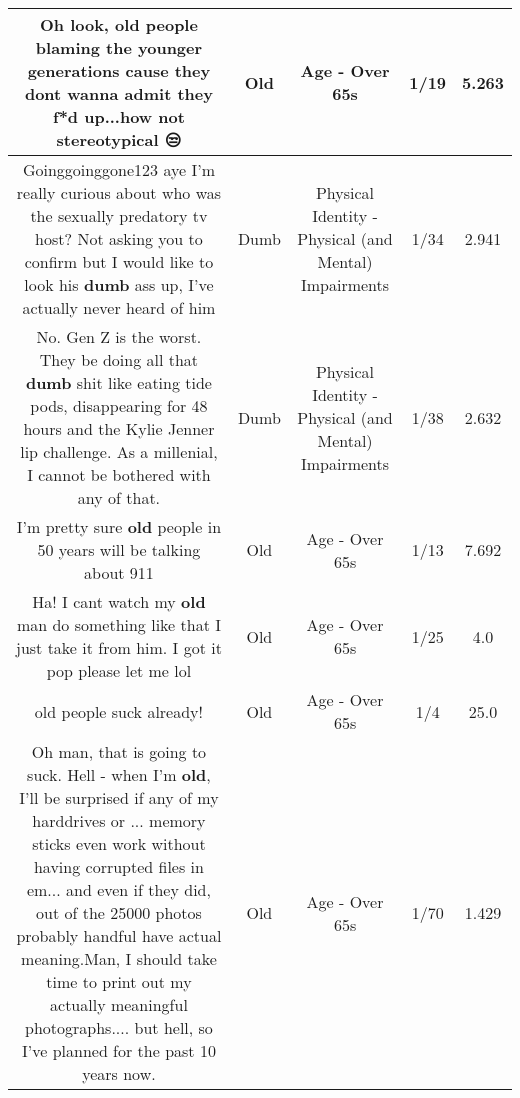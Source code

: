 \documentclass[11pt]{article}
\newlength\mylength
\begin{document}
\begin{center}
\begin{longtable}{|C{.65\mylength}|C{.30\mylength}|C{.12\mylength}|C{.12\mylength}|C{.12\mylength}|}
  \small Oh look, \textbf{old} people blaming the younger generations cause they dont wanna admit they f*d up...how not stereotypical 😒\normalsize   & Old & Age - Over 65s & 1/19 & 5.263 \\  \hline
  \small Goinggoinggone123 aye I'm really curious about who was the sexually predatory tv host? Not asking you to confirm but I would like to look his \textbf{dumb} ass up, I've actually never heard of him\normalsize   & Dumb & Physical Identity - Physical (and Mental) Impairments & 1/34 & 2.941 \\  \hline
  \small No. Gen Z is the worst. They  be doing all that \textbf{dumb} shit like eating tide pods, disappearing for 48 hours and the Kylie Jenner lip challenge. As a millenial, I cannot be bothered with any of that.\normalsize   & Dumb & Physical Identity - Physical (and Mental) Impairments & 1/38 & 2.632 \\  \hline
  \small I'm pretty sure \textbf{old} people in 50 years will be talking about 911\normalsize   & Old & Age - Over 65s & 1/13 & 7.692 \\  \hline
  \small Ha! I cant watch my \textbf{old} man do something like that I just take it from him. I got it pop please let me lol\normalsize   & Old & Age - Over 65s & 1/25 & 4.0 \\  \hline
  \small old people suck already!\normalsize   & Old & Age - Over 65s & 1/4 & 25.0 \\  \hline
  \small Oh man, that is going to suck. Hell - when I'm \textbf{old}, I'll be surprised if any of my harddrives or ... memory sticks even work without having corrupted files in em... and even if they did, out of the 25000 photos probably handful have actual meaning.Man, I should take time to print out my actually meaningful photographs.... but hell, so I've planned for the past 10 years now.\normalsize   & Old & Age - Over 65s & 1/70 & 1.429 \\  \hline

\end{longtable}
\end{center}
\end{document}
